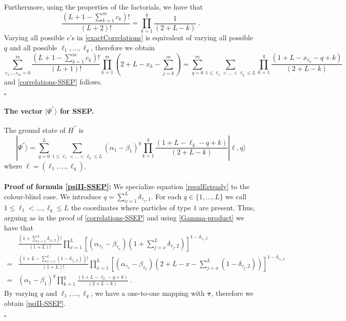 \documentclass[10pt]{article}
\numberwithin{equation}{section}
\numberwithin{equation}{subsection}
\newcommand{\dt}{\;.}
\begin{document}
Furthermore, using the properties of the factorials, we have that 
\begin{equation}\label{Gamma-product}
	\frac{(L+1-\sum_{k=1}^{m}c_{k})!}{(L+2)!}=\prod_{k=1}^{q}\frac{1}{(2+L-k)}\dt
\end{equation}
Varying all possible $c$'s in \eqref{exactCorrelations} is equivalent of varying all possible $q$ and all possible $\ell_{1},\ldots,\ell_{q}$, therefore we obtain 
\begin{equation}
	\sum_{c_{1}\ldots,c_{m}=0}^{m}\frac{(L+1-\sum_{k=1}^{m}c_{k})!}{(L+1)!}\prod_{k=1}^{m}\left(2+L-x_{k}-\sum_{j=k}^{m}\right)=\sum_{q=0}^{m}\sum_{1\leq \ell_{1}<\ldots<\ell_{q}\leq L}\prod_{k=1}^{q}\frac{(1+L-x_{\ell_{k}}-q+k)}{(2+L-k)}
\end{equation}
and \eqref{correlations-SSEP} follows. 
\begin{flushright}
	$\square$
\end{flushright}
\paragraph{The vector $|\Psi^{''}\rangle$ for SSEP.} The ground state of $H^{''}$ is 
\begin{equation}\label{psiII-SSEP}
	|\Psi^{''}\rangle=\sum_{q=0}^{L}\sum_{1\leq \ell_{1}<\ldots<\ell_{q}\leq L}(\alpha_{1}-\beta_{1})^{q}\prod_{k=1}^{q}\frac{\left(1+L-\ell_{k}-q+k\right)}{(2+L-k)}|\bm{\ell},q\rangle
\end{equation}
where $\bm{\ell}=(\ell_{1},\ldots,\ell_{q})$. \\ \\
\textbf{Proof of formula \eqref{psiII-SSEP}:} We specialize equation \eqref{resulEsteady} to the colour-blind case. We introduce $q=\sum_{x=1}^{L}\delta_{\tau_{x},1}$. For each $q\in \{1,\ldots,L\}$ we call $1\leq\ell_{1}<\ldots,\ell_{q}\leq L$ the coordinates where particles of type $1$ are present. Thus, arguing as in the proof of \eqref{correlations-SSEP} and using \eqref{Gamma-product} we have that 
\begin{align}
	&\frac{\left(1+\sum_{x=1}^{L}\delta_{\tau_{x},2}\right)!}{\left(1+L\right)!}\prod_{x=1}^{L}\left[(\alpha_{\tau_{x}}-\beta_{\tau_{x}})\left(1+\sum_{j=x}^{L}\delta_{\tau_{j},2}\right)\right]^{1-\delta_{\tau_{x},2}}\nonumber\\%
	=&\frac{\left(1+L-\sum_{x=1}^{L}(1-\delta_{\tau_{x},2})\right)!}{\left(1+L\right)!}\prod_{x=1}^{L}\left[(\alpha_{\tau_{x}}-\beta_{\tau_{x}})\left(2+L-x-\sum_{j=x}^{L}(1-\delta_{\tau_{j},2})\right)\right]^{1-\delta_{\tau_{x},2}}\nonumber\\
	=&(\alpha_{1}-\beta_{1})^{q}\prod_{k=1}^{q}\frac{\left(1+L-\ell_{k}-q+k\right)}{(2+L-k)}\dt
\end{align}
By varying $q$ and $\ell_{1},\ldots,\ell_{q}$, we have a one-to-one mapping with $\bm{\tau}$, therefore we obtain \eqref{psiII-SSEP}.
\begin{flushright}
	$\square$
\end{flushright}
\end{document}
